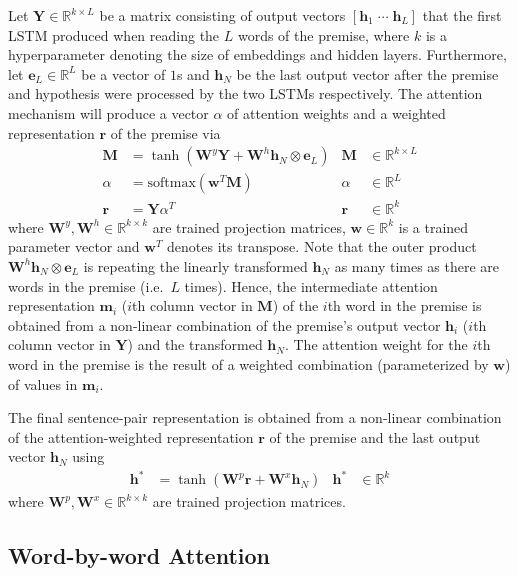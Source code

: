 \documentclass{article}
\begin{document}
Let $\mathbf{Y} \in \mathbb{R}^{k\times L}$ be a matrix consisting of output vectors $\left[\mathbf{h}_1 \;\cdots\; \mathbf{h}_L\right]$ that the first LSTM produced when reading the $L$ words of the premise, where $k$ is a hyperparameter denoting the size of embeddings and hidden layers.
Furthermore, let $\mathbf{e}_L \in \mathbb{R}^L$ be a vector of $1$s and $\mathbf{h}_N$ be the last output vector after the premise and hypothesis were processed by the two LSTMs respectively.
The attention mechanism will produce a vector $\alpha$ of attention weights and a weighted representation $\mathbf{r}$ of the premise via
\begin{align}
  \mathbf{M} &= \tanh(\mathbf{W}^y\mathbf{Y}+\mathbf{W}^h\mathbf{h}_N\otimes \mathbf{e}_L)&\mathbf{M}&\in\mathbb{R}^{k \times L}\\
  \alpha &= \text{softmax}(\mathbf{w}^T\mathbf{M})&\alpha&\in\mathbb{R}^L\\
  \mathbf{r} &= \mathbf{Y}\alpha^T&\mathbf{r}&\in\mathbb{R}^k
\end{align}
where $\mathbf{W}^y, \mathbf{W}^h \in \mathbb{R}^{k \times k}$ are trained projection matrices, $\mathbf{w} \in \mathbb{R}^k$ is a trained parameter vector and $\mathbf{w}^T$ denotes its transpose.
Note that the outer product $\mathbf{W}^h\mathbf{h}_N\otimes \mathbf{e}_L$ is repeating the linearly transformed $\mathbf{h}_N$ as many times as there are words in the premise (i.e.~$L$ times).
Hence, the intermediate attention representation $\mathbf{m}_i$ ($i$th column vector in $\mathbf{M}$) of the $i$th word in the premise is obtained from a non-linear combination of the premise's output vector $\mathbf{h}_i$ ($i$th column vector in $\mathbf{Y}$) and the transformed $\mathbf{h}_N$.
The attention weight for the $i$th word in the premise is the result of a weighted combination (parameterized by $\mathbf{w}$) of values in $\mathbf{m}_i$.

The final sentence-pair representation is obtained from a non-linear combination of the attention-weighted representation $\mathbf{r}$ of the premise and the last output vector $\mathbf{h}_N$ using
\begin{align}
  \mathbf{h}^* & = \tanh(\mathbf{W}^p\mathbf{r}+\mathbf{W}^x\mathbf{h}_N)&\mathbf{h}^*&\in\mathbb{R}^k\label{eq:att}
\end{align}
where $\mathbf{W}^p, \mathbf{W}^x \in \mathbb{R}^{k\times k}$ are trained projection matrices.

\subsection{Word-by-word Attention}
\label{sec:iatt}
\end{document}
